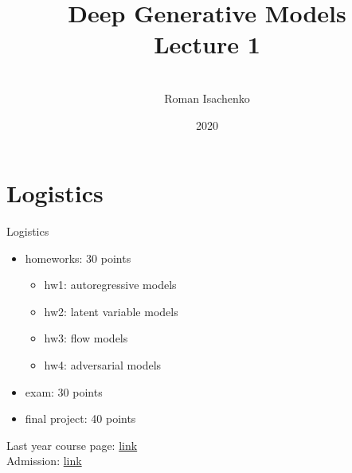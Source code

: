 \documentclass{beamer}
\title[\hbox to 56mm{Deep Generative Models  \hfill\insertframenumber\,/\,\inserttotalframenumber}]
{Deep Generative Models \\ Lecture 1}
\author[Roman Isachenko]{\\Roman Isachenko}
\institute[MIPT]{Moscow Institute of Physics and Technology \\
}
\date{2020}
\begin{document}
\begin{frame}
\titlepage
\end{frame}
\section{Logistics}
\begin{frame}{Logistics}
    \begin{itemize}
        \item homeworks: 30 points
        \begin{itemize}
            \item hw1: autoregressive models
            \item hw2: latent variable models
            \item hw3: flow models
            \item hw4: adversarial models
        \end{itemize}
        \item exam: 30 points
        \item final project: 40 points
    \end{itemize}
    Last year course page: \href{http://bit.ly/IS_B2}{link} \\
    Admission: \href{https://docs.google.com/spreadsheets/d/1FpTneCfkYNIG1FMxG7ALTwMCGDngkqc_OJC6SDqeG0Q/edit?usp=sharing}{link}
\end{frame}
\end{document}
